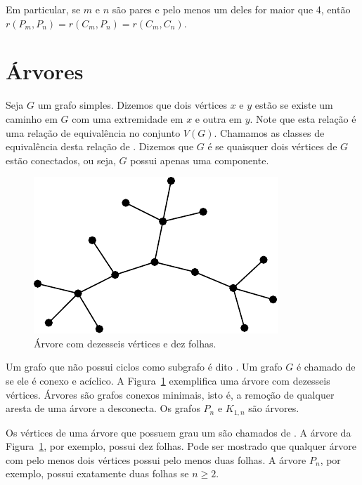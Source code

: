 Em particular, se $m$ e $n$ são pares e pelo menos um deles for maior que 4, então $r(P_m, P_n) = r(C_m, P_n) = r(C_m, C_n)$.


\section{Árvores}

Seja $G$ um grafo simples. Dizemos que dois vértices $x$ e $y$ estão  se existe um caminho em $G$ com uma extremidade em $x$ e outra em $y$. Note que esta relação é uma relação de equivalência no conjunto $V(G)$. Chamamos as classes de equivalência desta relação de . Dizemos que $G$ é  se quaisquer dois vértices de $G$ estão conectados, ou seja, $G$ possui apenas uma componente.

\begin{figure}[ht!]
\centering
\includegraphics{figures/3_graph_4_tree}
\caption{Árvore com dezesseis vértices e dez folhas.}
\label{graph:fig:tree}
\end{figure}

Um grafo que não possui ciclos como subgrafo é dito .
Um grafo $G$ é chamado de  se ele é conexo e acíclico. A Figura~\ref{graph:fig:tree} exemplifica uma árvore com dezesseis vértices. Árvores são grafos conexos minimais, isto é, a remoção de qualquer aresta de uma árvore a desconecta. Os grafos $P_n$ e $K_{1,n}$ são árvores.

Os vértices de uma árvore que possuem grau um são chamados de . A árvore da Figura~\ref{graph:fig:tree}, por exemplo, possui dez folhas. Pode ser mostrado que qualquer árvore com pelo menos dois vértices possui pelo menos duas folhas. A árvore $P_n$, por exemplo, possui exatamente duas folhas se $n \geq 2$.

